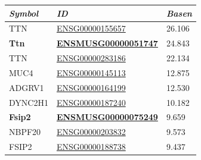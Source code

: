 \documentclass[12pt]{article}
\begin{document}
\begin{figure}[htbp]
	\centering
	\begin{minipage}{0.45\textwidth}
		\centering
		\begin{tabular}{l|l|l}
			\textit{\textbf{Symbol}} & \textit{\textbf{ID}}                                                                                                                      & \textit{\textbf{Basen}} \\\hline
			TTN                      & \href{https://asia.ensembl.org/Homo_sapiens/Gene/Summary?db=core;g=ENSG00000155657;r=2:178525989-178830802}{ENSG00000155657}              & 26.106                   \\
			\textbf{Ttn}             & \href{https://asia.ensembl.org/Mus_musculus/Gene/Summary?db=core;g=ENSMUSG00000051747;r=2:76534324-76812891}{\textbf{ENSMUSG00000051747}} & 24.843                   \\
			TTN                      & \href{https://asia.ensembl.org/Homo_sapiens/Gene/Idhistory?g=ENSG00000283186}{ENSG00000283186}                                            & 22.134                   \\
			MUC4                     & \href{https://asia.ensembl.org/Homo_sapiens/Gene/Summary?db=core;g=ENSG00000145113;r=3:195746765-195811973}{ENSG00000145113}              & 12.875                   \\
			ADGRV1                   & \href{https://asia.ensembl.org/Homo_sapiens/Gene/Summary?db=core;g=ENSG00000164199;r=5:90529344-91164437}{ENSG00000164199}                & 12.530                   \\
			DYNC2H1                  & \href{https://asia.ensembl.org/Homo_sapiens/Gene/Summary?db=core;g=ENSG00000187240;r=11:103109410-103479863}{ENSG00000187240}             & 10.182                   \\
			\textbf{Fsip2}           & \href{https://asia.ensembl.org/Mus_musculus/Gene/Summary?db=core;g=ENSMUSG00000075249;r=2:82773978-82839281}{\textbf{ENSMUSG00000075249}} & 9.659                    \\
			NBPF20                   & \href{https://asia.ensembl.org/Homo_sapiens/Gene/Idhistory?g=ENSG00000203832}{ENSG00000203832}                                            & 9.573                    \\
			FSIP2                    & \href{https://asia.ensembl.org/Homo_sapiens/Gene/Summary?db=core;g=ENSG00000188738;r=2:185738804-185833290}{ENSG00000188738}              & 9.437                    \\

\end{tabular}
\end{minipage}
\end{figure}
\end{document}
